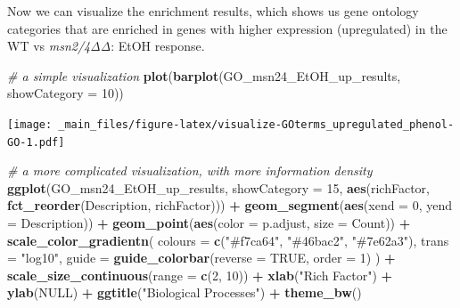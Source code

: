 \documentclass[
]{book}
\newenvironment{Shaded}{\begin{snugshade}}{\end{snugshade}}
\newcommand{\AttributeTok}[1]{\textcolor[rgb]{0.13,0.29,0.53}{#1}}
\newcommand{\CommentTok}[1]{\textcolor[rgb]{0.56,0.35,0.01}{\textit{#1}}}
\newcommand{\ConstantTok}[1]{\textcolor[rgb]{0.56,0.35,0.01}{#1}}
\newcommand{\DecValTok}[1]{\textcolor[rgb]{0.00,0.00,0.81}{#1}}
\newcommand{\FunctionTok}[1]{\textcolor[rgb]{0.13,0.29,0.53}{\textbf{#1}}}
\newcommand{\NormalTok}[1]{#1}
\newcommand{\SpecialCharTok}[1]{\textcolor[rgb]{0.81,0.36,0.00}{\textbf{#1}}}
\newcommand{\StringTok}[1]{\textcolor[rgb]{0.31,0.60,0.02}{#1}}
\begin{document}
Now we can visualize the enrichment results, which shows us gene ontology categories that are enriched in genes with higher expression (upregulated) in the WT vs \emph{msn2/4ΔΔ}: EtOH response.

\begin{Shaded}
\begin{Highlighting}[]
\CommentTok{\# a simple visualization}
\FunctionTok{plot}\NormalTok{(}\FunctionTok{barplot}\NormalTok{(GO\_msn24\_EtOH\_up\_results, }\AttributeTok{showCategory =} \DecValTok{10}\NormalTok{))}
\end{Highlighting}
\end{Shaded}

\texttt{[image: \_main\_files/figure-latex/visualize-GOterms\_upregulated\_phenol-GO-1.pdf]}

\begin{Shaded}
\begin{Highlighting}[]
\CommentTok{\# a more complicated visualization, with more information density}
\FunctionTok{ggplot}\NormalTok{(GO\_msn24\_EtOH\_up\_results,}
       \AttributeTok{showCategory =} \DecValTok{15}\NormalTok{,}
       \FunctionTok{aes}\NormalTok{(richFactor, }\FunctionTok{fct\_reorder}\NormalTok{(Description, richFactor))) }\SpecialCharTok{+}
  \FunctionTok{geom\_segment}\NormalTok{(}\FunctionTok{aes}\NormalTok{(}\AttributeTok{xend =} \DecValTok{0}\NormalTok{, }\AttributeTok{yend =}\NormalTok{ Description)) }\SpecialCharTok{+}
  \FunctionTok{geom\_point}\NormalTok{(}\FunctionTok{aes}\NormalTok{(}\AttributeTok{color =}\NormalTok{ p.adjust, }\AttributeTok{size =}\NormalTok{ Count)) }\SpecialCharTok{+}
  \FunctionTok{scale\_color\_gradientn}\NormalTok{(}
    \AttributeTok{colours =} \FunctionTok{c}\NormalTok{(}\StringTok{"\#f7ca64"}\NormalTok{, }\StringTok{"\#46bac2"}\NormalTok{, }\StringTok{"\#7e62a3"}\NormalTok{),}
    \AttributeTok{trans =} \StringTok{"log10"}\NormalTok{,}
    \AttributeTok{guide =} \FunctionTok{guide\_colorbar}\NormalTok{(}\AttributeTok{reverse =} \ConstantTok{TRUE}\NormalTok{, }\AttributeTok{order =} \DecValTok{1}\NormalTok{)}
\NormalTok{  ) }\SpecialCharTok{+}
  \FunctionTok{scale\_size\_continuous}\NormalTok{(}\AttributeTok{range =} \FunctionTok{c}\NormalTok{(}\DecValTok{2}\NormalTok{, }\DecValTok{10}\NormalTok{)) }\SpecialCharTok{+}
  \FunctionTok{xlab}\NormalTok{(}\StringTok{"Rich Factor"}\NormalTok{) }\SpecialCharTok{+}
  \FunctionTok{ylab}\NormalTok{(}\ConstantTok{NULL}\NormalTok{) }\SpecialCharTok{+}
  \FunctionTok{ggtitle}\NormalTok{(}\StringTok{"Biological Processes"}\NormalTok{) }\SpecialCharTok{+}
  \FunctionTok{theme\_bw}\NormalTok{()}
\end{Highlighting}
\end{Shaded}
\end{document}
